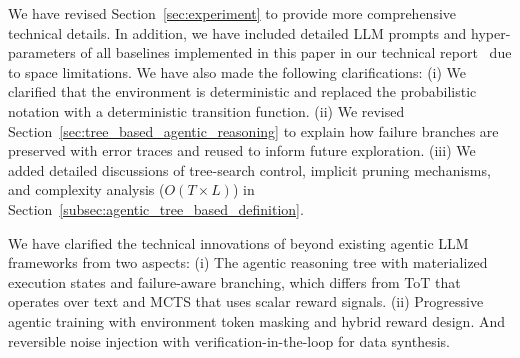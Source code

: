 

 We have revised Section~\ref{sec:experiment} to provide more comprehensive technical details. In addition, we have included detailed LLM prompts and hyper-parameters of all baselines implemented in this paper in our technical report~\cite{technical_report} due to space limitations. We have also made the following clarifications: (i) We clarified that the environment is deterministic and replaced the probabilistic notation with a deterministic transition function. (ii) We revised Section~\ref{sec:tree_based_agentic_reasoning} to explain how failure branches are preserved with error traces and reused to inform future exploration. (iii) We added detailed discussions of tree-search control, implicit pruning mechanisms, and complexity analysis ($O(T \times L)$) in Section~\ref{subsec:agentic_tree_based_definition}.



We have clarified the technical innovations of \sys beyond existing agentic LLM frameworks from two aspects: (i) The agentic reasoning tree with materialized execution states and failure-aware branching, which differs from ToT that operates over text and MCTS that uses scalar reward signals. (ii) Progressive agentic training with environment token masking and hybrid reward design. And reversible noise injection with verification-in-the-loop for data synthesis.

